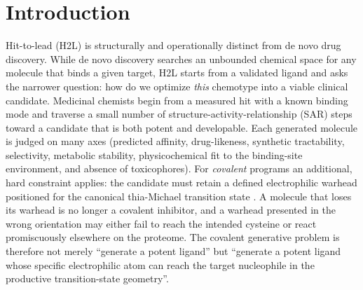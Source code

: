 \section{Introduction}\label{sec:intro}

Hit-to-lead (H2L) is structurally and operationally distinct from de novo drug discovery. While de novo discovery searches an unbounded chemical space for any molecule that binds a given target, H2L starts from a validated ligand and asks the narrower question: how do we optimize \emph{this} chemotype into a viable clinical candidate. Medicinal chemists begin from a measured hit with a known binding mode and traverse a small number of structure-activity-relationship (SAR) steps toward a candidate that is both potent and developable. Each generated molecule is judged on many axes (predicted affinity, drug-likeness, synthetic tractability, selectivity, metabolic stability, physicochemical fit to the binding-site environment, and absence of toxicophores). For \emph{covalent} programs an additional, hard constraint applies: the candidate must retain a defined electrophilic warhead positioned for the canonical thia-Michael transition state \cite{lonsdale2018structure,burgi1974stereochemistry}. A molecule that loses its warhead is no longer a covalent inhibitor, and a warhead presented in the wrong orientation may either fail to reach the intended cysteine or react promiscuously elsewhere on the proteome. The covalent generative problem is therefore not merely ``generate a potent ligand'' but ``generate a potent ligand whose specific electrophilic atom can reach the target nucleophile in the productive transition-state geometry''.

